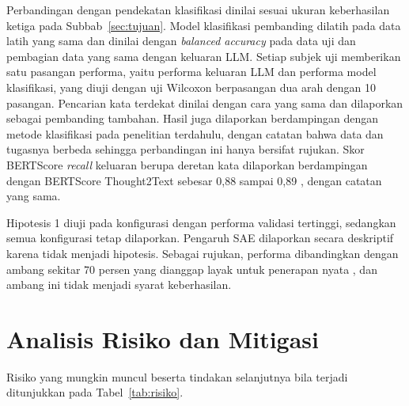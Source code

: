 Perbandingan dengan pendekatan klasifikasi dinilai sesuai ukuran keberhasilan ketiga pada Subbab~\ref{sec:tujuan}.
Model klasifikasi pembanding dilatih pada data latih yang sama dan dinilai dengan \textit{balanced accuracy} pada data uji dan pembagian data yang sama dengan keluaran LLM.
Setiap subjek uji memberikan satu pasangan performa, yaitu performa keluaran LLM dan performa model klasifikasi, yang diuji dengan uji Wilcoxon berpasangan dua arah dengan 10 pasangan.
Pencarian kata terdekat dinilai dengan cara yang sama dan dilaporkan sebagai pembanding tambahan.
Hasil juga dilaporkan berdampingan dengan metode klasifikasi pada penelitian terdahulu, dengan catatan bahwa data dan tugasnya berbeda sehingga perbandingan ini hanya bersifat rujukan.
Skor BERTScore \textit{recall} keluaran berupa deretan kata dilaporkan berdampingan dengan BERTScore Thought2Text sebesar 0,88 sampai 0,89 \parencite{mishra2025}, dengan catatan yang sama.

Hipotesis 1 diuji pada konfigurasi dengan performa validasi tertinggi, sedangkan semua konfigurasi tetap dilaporkan.
Pengaruh SAE dilaporkan secara deskriptif karena tidak menjadi hipotesis.
Sebagai rujukan, performa dibandingkan dengan ambang sekitar 70 persen yang dianggap layak untuk penerapan nyata \parencite{lopezbernal2022}, dan ambang ini tidak menjadi syarat keberhasilan.

\section{Analisis Risiko dan Mitigasi}
\label{sec:rencana-risiko}
Risiko yang mungkin muncul beserta tindakan selanjutnya bila terjadi ditunjukkan pada Tabel~\ref{tab:risiko}.

